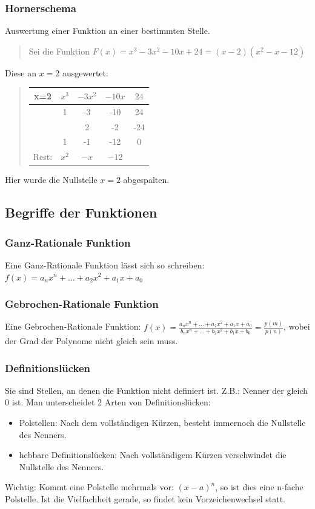 \subsubsection*{Hornerschema}

Auswertung einer Funktion an einer bestimmten Stelle.
\begin{verse}
Sei die Funktion $F(x)=x^{3}-3x^{2}-10x+24=(x-2)(x^{2}-x-12)$
\end{verse}
Diese an $x=2$ ausgewertet:
\begin{verse}
\begin{tabular}{ccccc}
\hline 
\multicolumn{1}{|c}{x=2} & $x^{3}$ & $-3x^{2}$ & $-10x$ & \multicolumn{1}{c|}{$24$}\tabularnewline
\hline 
 & 1 & -3 & -10 & 24\tabularnewline
 &  & 2 & -2 & -24\tabularnewline
\hline 
 & 1 & -1 & -12 & 0\tabularnewline
\hline 
Rest: & $x^{2}$ & $-x$ & $-12$ & \tabularnewline
\end{tabular}
\end{verse}
Hier wurde die Nullstelle $x=2$ abgespalten.


\subsection*{Begriffe der Funktionen}


\subsubsection*{Ganz-Rationale Funktion}

Eine Ganz-Rationale Funktion lässt sich so schreiben: $f(x)=a_{n}x^{n}+...+a_{2}x^{2}+a_{1}x+a_{0}$


\subsubsection*{Gebrochen-Rationale Funktion}

Eine Gebrochen-Rationale Funktion: $f(x)=\frac{a_{n}x^{n}+...+a_{2}x^{2}+a_{1}x+a_{0}}{b_{n}x^{n}+...+b_{2}x^{2}+b_{1}x+b_{0}}=\frac{p(m)}{p(n)}$,
wobei der Grad der Polynome nicht gleich sein muss.


\subsubsection*{Definitionslücken}

Sie sind Stellen, an denen die Funktion nicht definiert ist. Z.B.:
Nenner der gleich 0 ist. Man unterscheidet 2 Arten von Definitionslücken:
\begin{itemize}
\item Polstellen: Nach dem vollständigen Kürzen, besteht immernoch die Nullstelle
des Nenners.
\item hebbare Definitionslücken: Nach vollständigem Kürzen verschwindet
die Nullstelle des Nenners.
\end{itemize}
Wichtig: Kommt eine Polstelle mehrmals vor: $(x-a)^{n}$, so ist dies
eine n-fache Polstelle. Ist die Vielfachheit gerade, so findet kein
Vorzeichenwechsel statt.


